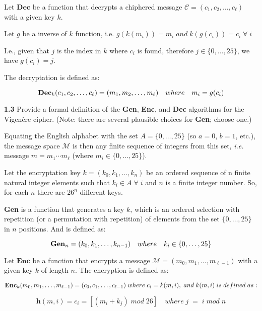 Let \(\textbf{Dec}\) be a function that decrypts a chiphered message \( \mathcal{C} = (c_1, c_2, \dots, c_\ell) \) with a given key \( k \).

Let \(g\) be a inverse of \(k\) function, i.e. \(g(k(m_i)) = m_i \; and \; k(g(c_i)) = c_i  \; \forall \; i\)

I.e., given that \( j \) is the index in \( k \) where \( c_i \) is found, therefore \( j \in \{0, \dots, 25\} \), we have \( g(c_i) = j \).

The decryptation is defined as:

\[
\textbf{Dec\( _k\)}(c_1, c_2, \dots, c_\ell) = (m_1, m_2, \dots, m_\ell) \quad where \quad m_i = g(c_i)
\]

\vspace{1em}
\noindent
\textbf{1.3} \hspace{1em} Provide a formal definition of the \textbf{Gen}, \textbf{Enc}, and \textbf{Dec} algorithms for the Vigenère cipher. (Note: there are several plausible choices for \textbf{Gen}; choose one.)
\vspace{1em}

Equating the English alphabet with the set \( A = \{0, \dots, 25\}\) (so \( a = 0 \), \( b = 1 \), etc.), the message space 
\( \mathcal{M} \) is then any finite sequence of integers from this set, \textit{i.e.} message \( m = m_1 \cdots m_\ell \) (where \( m_i \in \{0, \dots, 25\} \)).

Let the encryptation key \( k = (k_0, k_1, \dots, k_{n}) \) be an ordered sequence of n finite natural integer  elements such that \( k_i \in A \; \forall  \; i \) and \(n\) is a finite integer number. So, for each \(n\) there are \(26^n\) different keys.

\textbf{Gen} is a function that generates a key \( k \), which is an ordered selection with repetition (or a permutation with repetition) of elements from the set \( \{0, \dots, 25\} \) in \( n \) positions. And is defined as:

\[
\textbf{Gen\( _n\)} = (k_0, k_1, \dots, k_{n-1}) \quad where \quad k_i \in \{0, \dots, 25\}
\]

Let \(\textbf{Enc}\) be a function that encrypts a message \( \mathcal{M} = (m_0, m_1, \dots, m_{\ell-1}) \) with a given key \( k \) of length \(n\). The encryption is defined as:

\[
\textbf{Enc\( _k\)}(m_0, m_1, \dots, m_{\ell-1}) = (c_0, c_1, \dots, c_{\ell-1}) \; where \; c_i = k(m, i),\; and \; k(m, i) \;is\;defined\;as:
\]

\[
\textbf{h}(m, i) = c_i = [(m_i + k_j) \; mod \;26] \quad where \; j \; = \; i \; mod \; n
\]

